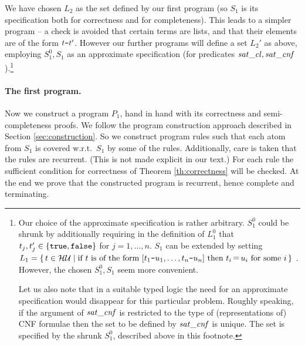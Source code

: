 \documentclass{tlp}
\newcommand*{\mydash}{{\mbox{\tt-}}}
\newcommand*{\HU}{{\ensuremath{\cal{H U}}}\xspace}
\begin{document}
We have chosen $L_2$  as the set defined by our first program
(so $S_1$ is its specification both for correctness and for completeness).
  This leads to a simpler program
-- a check is avoided that certain terms are lists, and that their elements
are of the form $t\mydash t'$.
However our further programs will define a set $L_2'$ as above,
employing $S_1^0, S_1$ as an approximate specification
(for predicates  ${\it sat\_cl}, {\it sat\_c n f}$).\footnote{Our choice of the approximate specification is rather arbitrary.
    $S_1^0$ could be shrunk by additionally requiring
    in the definition of $L_1^0$
         that $t_j,t'_j\in\{ {\tt true},{\tt false} \}$
            for $j=1,\ldots, n$.
        $S_1$ can be extended by setting 
        $L_1= \{\, t\in\HU \mid 
        \mbox{if } t \mbox{ is of the form } 
        [t_1\mydash u_1,\ldots,t_n\mydash u_n] \mbox{ then }
        t_i\mathop=u_i \mbox{ for some } i \,\}
        $ 
        \cite{drabent12.iclp}.
  However, the chosen $S_1^0, S_1$ seem more convenient.

  Let us also note that in a suitable typed logic 
  the need for an approximate specification
  would disappear for this particular problem.  Roughly speaking,
  if the argument of ${\it sat\_c n f}$ is restricted to the type of
  (representations of) CNF formulae then 
  the set to be defined by ${\it sat\_c n f}$ is unique.
The set is specified by the shrunk $S_1^0$, described above
  in this footnote.
} 


















\paragraph{The first program.}
Now we construct a program $P_1$, hand in hand with its correctness and
semi-completeness proofs.
We follow the program construction approach described in Section
\ref{sec:construction}.
So we construct program rules such that
each atom from $S_1$ is covered w.r.t.\ $S_1$ by some of the rules.
Additionally, care is taken that the rules are recurrent.
(This is not made explicit in our text.)
For each rule the sufficient condition for correctness of 
Theorem \ref{th:correctness} will be checked.
At the end we prove that the constructed program is recurrent, 
hence complete and terminating.
\end{document}
